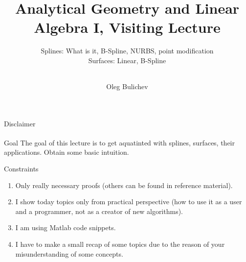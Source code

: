 \documentclass[aspectratio=169,notes]{beamer}
\title[AGLA1]{Analytical Geometry and Linear Algebra I, Visiting Lecture} %
\subtitle{Splines: What is it, B-Spline, NURBS, point modification
\\ Surfaces: Linear, B-Spline  \\ \ 
         } %
\author{Oleg Bulichev}
\newcommand{\fbckg}[1]{\usebackgroundtemplate{\texttt{[image: \#1]}}}%
\begin{document}
\setlength{\abovedisplayskip}{0pt}
\setlength{\belowdisplayskip}{0pt}
\setlength{\abovedisplayshortskip}{0pt}
\setlength{\belowdisplayshortskip}{0pt}

\fbckg{fibeamer/figs/title_page.png}
\note{
    \begin{enumerate}
        \item \ 

    \end{enumerate}
}

\fbckg{fibeamer/figs/common.png}



\begin{frame}[t]{Disclaimer}
\framesubtitle{}
\begin{block}{Goal}
    The goal of this lecture is to get aquatinted with splines, surfaces, their applications. Obtain some basic intuition. 
\end{block}

\begin{alertblock}{Constraints}
    \begin{enumerate}
        \item Only really necessary proofs (others can be found in reference material).
        \item I show today topics only from practical perspective (how to use it as a user and a programmer, not as a creator of new algorithms).
        \item I am using Matlab code snippets.
        \item I have to make a small recap of some topics due to the reason of your misunderstanding of some concepts. 
    \end{enumerate}
\end{alertblock}
\end{frame}
\end{document}
